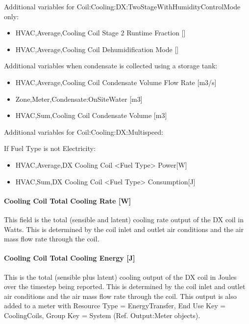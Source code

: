 Additional variables for Coil:Cooling:DX:TwoStageWithHumidityControlMode only:

\begin{itemize}
\item
  HVAC,Average,Cooling Coil Stage 2 Runtime Fraction {[]}
\item
  HVAC,Average,Cooling Coil Dehumidification Mode {[]}
\end{itemize}

Additional variables when condensate is collected using a storage tank:

\begin{itemize}
\item
  HVAC,Average,Cooling Coil Condensate Volume Flow Rate {[}m3/s{]}
\item
  Zone,Meter,Condensate:OnSiteWater {[}m3{]}
\item
  HVAC,Sum,Cooling Coil Condensate Volume {[}m3{]}
\end{itemize}

Additional variables for Coil:Cooling:DX:Multispeed:

If Fuel Type is not Electricity:

\begin{itemize}
\item
  HVAC,Average,DX Cooling Coil \textless{}Fuel Type\textgreater{} Power{[}W{]}
\item
  HVAC,Sum,DX Cooling Coil \textless{}Fuel Type\textgreater{} Consumption{[}J{]}
\end{itemize}

\paragraph{Cooling Coil Total Cooling Rate {[}W{]}}\label{cooling-coil-total-cooling-rate-w-4}

This field is the total (sensible and latent) cooling rate output of the DX coil in Watts. This is determined by the coil inlet and outlet air conditions and the air mass flow rate through the coil.

\paragraph{Cooling Coil Total Cooling Energy {[}J{]}}\label{cooling-coil-total-cooling-energy-j-4}

This is the total (sensible plus latent) cooling output of the DX coil in Joules over the timestep being reported. This is determined by the coil inlet and outlet air conditions and the air mass flow rate through the coil. This output is also added to a meter with Resource Type = EnergyTransfer, End Use Key = CoolingCoils, Group Key = System (Ref. Output:Meter objects).

